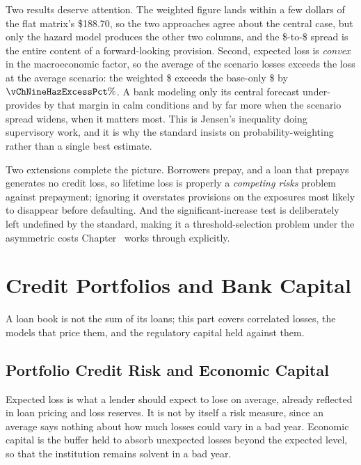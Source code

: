 \documentclass[../ai_in_finance]{subfiles}
\begin{document}
Two results deserve attention. The weighted figure lands within a few dollars of the flat matrix's \$188.70, so the two approaches agree about the central case, but only the hazard model produces the other two columns, and the \$\vChNineHazECLBenignRound-to-\$\vChNineHazECLAdverseRound{} spread is the entire content of a forward-looking provision. Second, expected loss is \emph{convex} in the macroeconomic factor, so the average of the scenario losses exceeds the loss at the average scenario: the weighted \$\vChNineHazECLWeighted{} exceeds the base-only \$\vChNineHazECLBase{} by $\vChNineHazExcessPct\%$. A bank modeling only its central forecast under-provides by that margin in calm conditions and by far more when the scenario spread widens, when it matters most. This is Jensen's inequality doing supervisory work, and it is why the standard insists on probability-weighting rather than a single best estimate.

Two extensions complete the picture. Borrowers prepay, and a loan that prepays generates no credit loss, so lifetime loss is properly a \emph{competing risks} problem against prepayment; ignoring it overstates provisions on the exposures most likely to disappear before defaulting. And the significant-increase test is deliberately left undefined by the standard, making it a threshold-selection problem under the asymmetric costs Chapter~ works through explicitly.

\section{Credit Portfolios and Bank Capital}

A loan book is not the sum of its loans; this part covers correlated losses, the models that price them, and the regulatory capital held against them.

\subsection{Portfolio Credit Risk and Economic Capital}
\label{sec:portfolio-credit-risk}

Expected loss is what a lender should expect to lose on average, already reflected in loan pricing and loss reserves. It is not by itself a risk measure, since an average says nothing about how much losses could vary in a bad year. Economic capital is the buffer held to absorb unexpected losses beyond the expected level, so that the institution remains solvent in a bad year.
\end{document}
